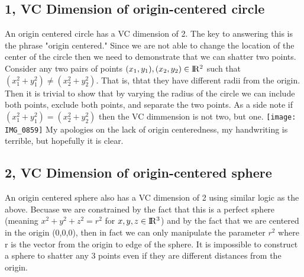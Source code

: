 \documentclass{article}
\begin{document}
    \subsection{1, VC Dimension of origin-centered circle}
    An origin centered circle has a VC dimension of 2. The key to answering this is the phrase "origin centered." Since we are not able
    to change the location of the center of the circle then we need to demonstrate that we can shatter two points. Consider
    any two pairs of points $(x_1, y_1), (x_2, y_2) \in {\rm I\!R^2}$ such that $(x_1^2 + y_1^2) \neq (x_2^2 + y_2^2)$.
    That is, thtat they have different radii from the origin. Then it is trivial to show that by varying the radius of the
    circle we can include both points, exclude both points, and separate the two points. As a side note if $(x_1^2 + y_1^2) = (x_2^2 + y_2^2)$
    then the VC dimmension is not two, but one.
    \linebreak
    \linebreak
    \texttt{[image: IMG\_0859]}
    \linebreak
    My apologies on the lack of origin centeredness, my handwriting is terrible, but hopefully it is clear.
    \subsection{2, VC Dimension of origin-centered sphere}
    An origin centered sphere also has a VC dimension of 2 using similar logic as the above. Becuase we are constrained
    by the fact that this is a perfect sphere (meaning $x^2 + y^2 + z^2 = r^2$ for $x, y, z \in {\rm I\!R^3}$) and by the fact
    that we are centered in the origin (0,0,0), then in fact we can only manipulate the parameter $r^2$ where r is the
    vector from the origin to edge of the sphere. It is impossible to construct a sphere to shatter any 3 points even if they
    are different distances from the origin.
\end{document}

